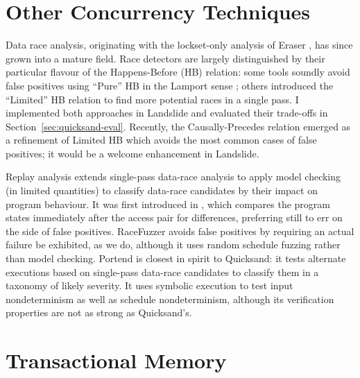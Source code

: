 \section{Other Concurrency Techniques}

Data race analysis, originating with the lockset-only analysis of Eraser \cite{eraser},
has since grown into a mature field.
Race detectors are largely distinguished by their particular flavour of the Happens-Before (HB) relation:
some tools \cite{fasttrack,djit} soundly avoid false positives using ``Pure'' HB in the Lamport sense \cite{lamport-clocks};
others \cite{tsan,hybriddatarace} introduced the ``Limited'' HB relation to find more potential races in a single pass.
I implemented both approaches in Landslide and evaluated their trade-offs in Section~\ref{sec:quicksand-eval}.
%
Recently, the Causally-Precedes relation \cite{predictive-dr} emerged as a refinement of Limited HB which avoids the most common cases of false positives; it would be a welcome enhancement in Landslide.

Replay analysis extends single-pass data-race analysis to apply model checking (in limited quantities) to classify data-race candidates by their impact on program behaviour.
It was first introduced in \cite{recordreplaydrs}, which compares the program states immediately after the access pair for differences, preferring still to err on the side of false positives.
RaceFuzzer \cite{racefuzzer} avoids false positives by requiring an actual failure be exhibited, as we do,
although it uses random schedule fuzzing rather than model checking.
%
Portend \cite{portend} is closest in spirit to Quicksand:
it tests alternate executions based on single-pass data-race candidates to classify them in a taxonomy of likely severity.
It uses symbolic execution to test input nondeterminism as well as schedule nondeterminism,
although its verification properties are not as strong as Quicksand's.


\section{Transactional Memory}
\label{sec:related-tm}

